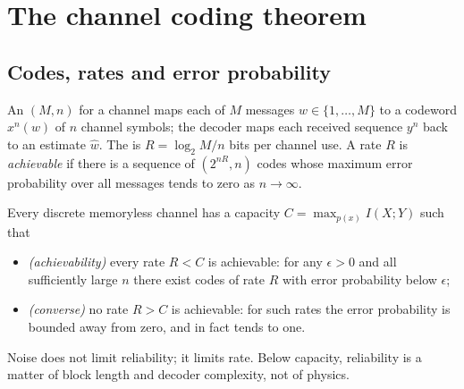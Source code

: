 \par\vspace{0pt plus 10\baselineskip}\vspace{0pt plus -10\baselineskip}
\section{The channel coding theorem}
\label{sec:ch13:cct}

\subsection{Codes, rates and error probability}

An $(M,n)$  for a channel maps each of $M$ messages $w\in\{1,\ldots,M\}$ to a
codeword $x^n(w)$ of $n$ channel symbols; the decoder maps each received sequence $y^n$ back to an
estimate $\hat w$. The  is $R=\log_2M/n$ bits per channel use. A rate $R$ is
\emph{achievable} if there is a sequence of $(2^{nR},n)$ codes whose maximum error probability over
all messages tends to zero as $n\to\infty$.

\begin{keyidea}
Every discrete memoryless channel has a capacity $C=\max_{p(x)}I(X;Y)$ such that
\begin{itemize}
\item \emph{(achievability)} every rate $R<C$ is achievable: for any $\epsilon>0$ and all
sufficiently large $n$ there exist codes of rate $R$ with error probability below $\epsilon$;
\item \emph{(converse)} no rate $R>C$ is achievable: for such rates the error probability is
bounded away from zero, and in fact tends to one.
\end{itemize}
Noise does not limit reliability; it limits rate. Below capacity, reliability is a matter of
block length and decoder complexity, not of physics.
\end{keyidea}


